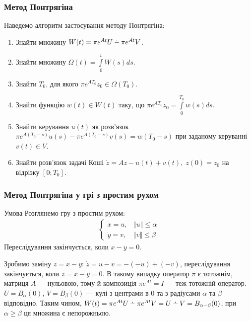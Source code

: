 \documentclass[10pt,pdf,aspectratio=169]{beamer}
\renewcommand{\d}[1]{\dot{#1}}
\newcommand{\norm}[1]{\left\Vert #1 \right\Vert}
\newcommand{\intl}{\int\limits}
\def\setdif{\mathbin{\ooalign{\hss\raise1ex\hbox{.}\hss\cr
  \mathsurround=0pt$-$}}}
\begin{document}
    \begin{frame}
        \frametitle{Метод Понтрягіна}
    
        Наведемо алгоритм застосування методу Понтрягіна:
    
        \begin{enumerate}
            \item Знайти множину $W(t) = \pi e^{At}U \setdif \pi e^{At}V$.
            \item Знайти множину $\Omega(t) = \intl_0^t W(s)ds$.
            \item Знайти $T_0$, для якого $\pi e^{A T_0} z_0 \in \Omega(T_0)$.
            \item Знайти функцію $w(t) \in W(t)$ таку, що $\pi e^{A T_0} z_0 = \intl_0^{T_0} w(s) ds$.
            \item Знайти керування $u(t)$ як розв'язок $\pi e^{A (T_0-s)} u(s) - \pi e^{A (T_0-s)} v(s) = w(T_0 - s) $ при заданому керуванні $v(t) \in V$.
            \item Знайти розв'язок задачі Коші $\d{z} = Az - u(t) + v(t), \; z(0) = z_0$ на відрізку $[0; T_0]$.
        \end{enumerate}
    \end{frame}
    \begin{frame}
        \frametitle{Метод Понтрягіна у грі з простим рухом}
        \begin{block}{Умова}
            Розглянемо гру з простим рухом:
            \begin{gather*}
                \begin{cases}
                    \d{x} = u, & \norm{u} \leq \alpha \\
                    \d{y} = v, & \norm{v} \leq \beta 
                \end{cases}
            \end{gather*}
            Переслідування закінчується, коли $x - y = 0$.
        \end{block}
        Зробимо заміну $z = x - y$: $\d{z} = u - v = -(-u) + (-v)$,
        переслідування закінчується, коли $z = x - y = 0$.
        В такому випадку оператор $\pi$ є тотожнім, матриця $A$ --- нульовою,
        тому й композиція $\pi e^{At} = I$ --- теж тотожній оператор.
        $U = B_{\alpha}(0)$, $V = B_{\beta}(0)$ --- кулі з центрами в $0$ та з радіусами
        $\alpha$ та $\beta$ відповідно. Таким чином, $W(t) = 
        \pi e^{At} U \setdif \pi e^{A t} V = U \setdif V = B_{\alpha - \beta}(0)$,
        при $\alpha \geq \beta$ ця множина є непорожньою.
    \end{frame}
\end{document}
